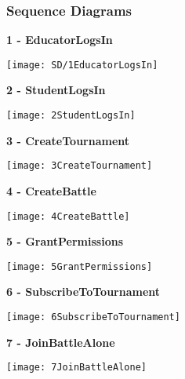 \clearpage
\subsubsection{Sequence Diagrams}


\begin{minipage}{\textwidth}
\textbf{1 - EducatorLogsIn}
\begin{center}
	\texttt{[image: SD/1EducatorLogsIn]}
\end{center}
\end{minipage}

\begin{minipage}{\textwidth}
\textbf{2 - StudentLogsIn}
\begin{center}
	\texttt{[image: 2StudentLogsIn]}
\end{center}
\end{minipage}

\begin{minipage}{\textwidth}
	\textbf{3 - CreateTournament}
	\begin{center}
		\texttt{[image: 3CreateTournament]}
	\end{center}
\end{minipage}

\begin{minipage}{\textwidth}
	\textbf{4 - CreateBattle}
	\begin{center}
		\texttt{[image: 4CreateBattle]}
	\end{center}
\end{minipage}

\begin{minipage}{\textwidth}
	\textbf{5 - GrantPermissions}
	\begin{center}
		\texttt{[image: 5GrantPermissions]}
	\end{center}
\end{minipage}

\begin{minipage}{\textwidth}
	\textbf{6 - SubscribeToTournament}
	\begin{center}
		\texttt{[image: 6SubscribeToTournament]}
	\end{center}
\end{minipage}

\begin{minipage}{\textwidth}
	\textbf{7 - JoinBattleAlone}
	\begin{center}
		\texttt{[image: 7JoinBattleAlone]}
	\end{center}
\end{minipage}

